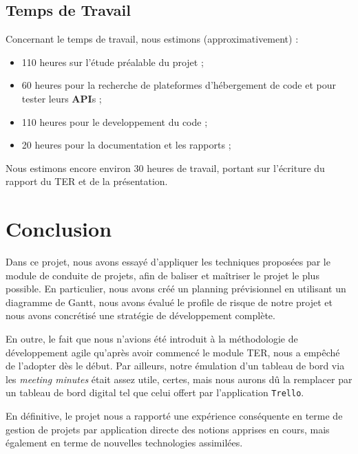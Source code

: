 \documentclass[12pt,a4paper]{report}
\begin{document}
\newpage

\section{Temps de Travail}
Concernant le temps de travail, nous estimons (approximativement) :
\begin{itemize}
\item 110 heures sur l'étude préalable du projet ;
\item 60 heures pour la recherche de plateformes d'hébergement de code et pour tester leurs \textbf{API}s ;
\item 110 heures pour le developpement du code ;
\item 20 heures pour la documentation et les rapports ;
\end{itemize}

\noindent Nous estimons encore environ 30 heures de travail, portant sur l'écriture du rapport du TER et de la présentation.

\chapter{Conclusion}
Dans ce projet, nous avons essayé d'appliquer les techniques proposées par le module de conduite de projets, afin de baliser et maîtriser le projet le plus possible. En particulier, nous avons créé un planning prévisionnel en utilisant un diagramme de Gantt, nous avons évalué le profile de risque de notre projet et nous avons concrétisé une stratégie de développement complète.

En outre, le fait que nous n'avions été introduit à la méthodologie de développement agile qu'après avoir commencé le module TER, nous a empêché de l'adopter dès le début. Par ailleurs, notre émulation d'un tableau de bord via les \textit{meeting minutes} était assez utile, certes, mais nous aurons dû la remplacer par un tableau de bord digital tel que celui offert par l'application \texttt{Trello}.

En définitive, le projet nous a rapporté une expérience conséquente en terme de gestion de projets par application directe des notions apprises en cours, mais également en terme de nouvelles technologies assimilées.
\end{document}
